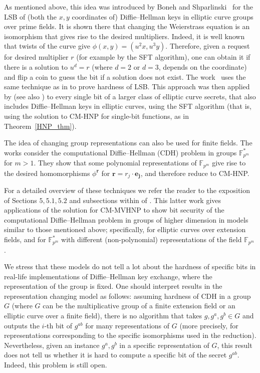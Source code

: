 \documentclass[11pt]{article}
\theoremstyle{definition}
\newcommand{\F}{{\mathbb{F}}}
\begin{document}
As mentioned above, this idea was introduced by Boneh and Shparlinski~\cite{BS} for the LSB of (both the $x,y$ coordinates of) Diffie--Hellman keys in elliptic curve groups over prime fields.
It is shown there that changing the Weierstrass equation is an isomorphism that gives rise to the desired multipliers. Indeed, it is well known that twists of the curve give $\phi(x,y) = (u^2x,u^3y)$. Therefore, given a request for desired multiplier $r$ (for example by the SFT algorithm), one can obtain it if there is a solution to $u^d = r$ (where $d=2$ or $d=3$, depends on the coordinate) and flip a coin to guess the bit if a solution does not exist. The work~\cite{BS} uses the same technique as in \cite{ACGS} to prove hardness of LSB. This approach was then applied by \cite{Duc} (see also \cite{Kiltz}) to every single bit of a larger class of elliptic curve secrets, that also includes Diffie--Hellman keys in elliptic curves, using the SFT algorithm (that is, using the solution to CM-HNP for single-bit functions, as in Theorem~\ref{HNP_thm}).

The idea of changing group representations can also be used for finite fields. The works \cite{Fazio,WZZ} consider the computational Diffie--Hellman (CDH) problem in groups $\F_{p^m}^*$ for $m>1$. They show that some polynomial representations of $\F_{p^m}$ give rise to the desired homomorphisms $\phi^\textbf{r}$ for $\textbf{r} = r_j \cdot \textbf{e}\boldsymbol{_j}$, and therefore reduce to CM-HNP.

For a detailed overview of these techniques we refer the reader to the exposition of Sections $5, 5.1, 5.2$ and subsections within of \cite{MVHNP}. This latter work gives applications of the solution for CM-MVHNP to show bit security of the computational Diffie--Hellman problem in groups of higher dimension in models similar to those mentioned above; specifically, for elliptic curves over extension fields, and for $\F_{p^m}^*$ with different (non-polynomial) representations of the field $\F_{p^m}$.

We stress that these models do not tell a lot about the hardness of specific bits in real-life implementations of Diffie--Hellman key exchange, where the representation of the group is fixed. One should interpret results in the representation changing model as follows: assuming hardness of CDH in a group $G$ (where $G$ can be the multiplicative group of a finite extension field or an elliptic curve over a finite field), there is no algorithm that takes $g, g^a,g^b \in G$ and outputs the $i$-th bit of $g^{ab}$ for many representations of $G$ (more precisely, for representations corresponding to the specific isomorphisms used in the reduction). Nevertheless, given an instance $g^a,g^b$ in a specific representation of $G$, this result does not tell us whether it is hard to compute a specific bit of the secret $g^{ab}$. Indeed, this problem is still open.
\end{document}
